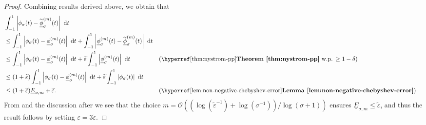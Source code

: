 \begin{proof}
Combining results derived above, we obtain that 
    \begin{align*}
        &\int_{-1}^{1} \left| \phi_{\sigma}(t) - \widetilde{\underline{\phi}}_{\sigma}^{(m)}(t) \right|~\mathrm{d}t \notag \\
        &\leq \int_{-1}^{1} \left| \phi_{\sigma}(t) - \underline{\phi}_{\sigma}^{(m)}(t) \right|~\mathrm{d}t + \int_{-1}^{1} \left| \underline{\phi}_{\sigma}^{(m)}(t) - \widetilde{\underline{\phi}}_{\sigma}^{(m)}(t) \right|~\mathrm{d}t &&  \notag \\
        &\leq \int_{-1}^{1} \left| \phi_{\sigma}(t) - \underline{\phi}_{\sigma}^{(m)}(t) \right|~\mathrm{d}t + \widetilde{\varepsilon} \int_{-1}^{1} \left| \underline{\phi}_{\sigma}^{(m)}(t) \right|~\mathrm{d}t && \text{(\refthm{thm:nystrom-pp} w.p. $\geq 1 - \delta$)} \notag \\
        &\leq (1 + \widetilde{\varepsilon}) \int_{-1}^{1} \left| \phi_{\sigma}(t) - \underline{\phi}_{\sigma}^{(m)}(t) \right|~\mathrm{d}t + \widetilde{\varepsilon} \int_{-1}^{1} \left| \phi_{\sigma}(t) \right|~\mathrm{d}t &&  \notag \\
        &\leq (1 + \widetilde{\varepsilon}) \underline{E}_{\sigma, m} + \widetilde{\varepsilon}. && \text{(\reflem{lem:non-negative-chebyshev-error})} \notag 
    \end{align*}
    From  and the discussion after  we see that the choice $m = \mathcal{O}((\log(\widetilde{\varepsilon}^{-1}) + \log(\sigma^{-1})) / \log(\sigma + 1))$ ensures $\underline{E}_{\sigma, m} \leq \widetilde{\varepsilon}$, and thus
    the result follows by setting $\varepsilon = 3 \widetilde{\varepsilon}$.
\end{proof}



